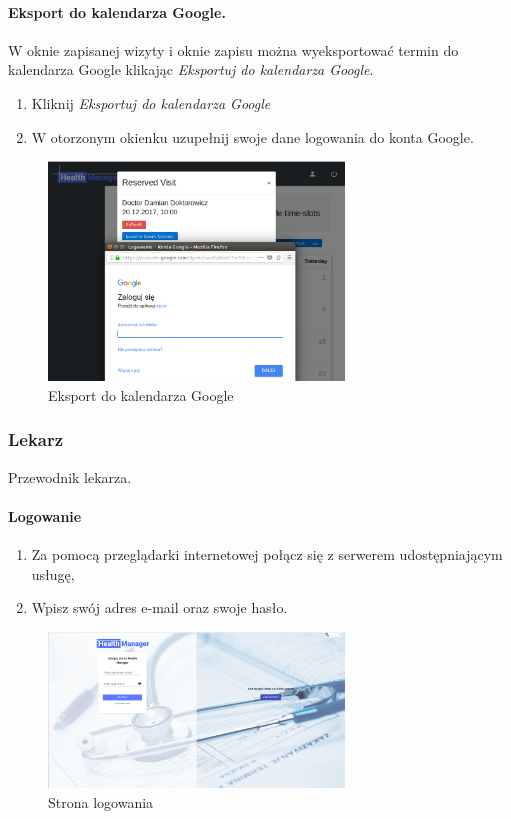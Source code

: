 \documentclass[polish,12pt]{aghthesis}
\begin{document}
    \paragraph{Eksport do kalendarza Google.}{ W oknie zapisanej wizyty i oknie zapisu można wyeksportować termin do kalendarza Google klikając \emph{Eksportuj do kalendarza Google}.
    \begin{enumerate},
      \item Kliknij \emph{Eksportuj do kalendarza Google}
      \item W otorzonym okienku uzupełnij swoje dane logowania do konta Google.
    \end{enumerate}
       \begin{figure}[H]
        \includegraphics[width=0.7\textwidth]{gui-google-export}
        \caption{Eksport do kalendarza Google}
        \end{figure}  
    }
\subsubsection{Lekarz}
Przewodnik lekarza.
    \paragraph{Logowanie}{
      \begin{enumerate}
          \item Za pomocą przeglądarki internetowej połącz się z serwerem udostępniającym usługę,
          \item Wpisz swój adres e-mail oraz swoje hasło.
      \end{enumerate}
      \begin{figure}[H]
          \includegraphics[width=0.7\textwidth]{gui-loginpage}
          \caption{Strona logowania}
      \end{figure}
    }
\end{document}
